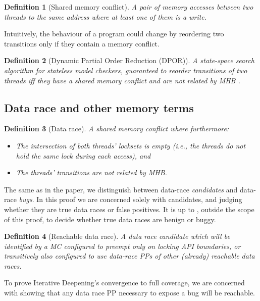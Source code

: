 \documentclass[pldi]{sigplanconf-pldi15}
\newtheorem{definition}{Definition}
\begin{document}
\begin{definition}[Shared memory conflict]
A pair of memory accesses between two threads to the same address where at least one of them is a write.
\end{definition}
Intuitively, the behaviour of a program could change by reordering two transitions only if they contain a memory conflict.

\begin{definition}[Dynamic Partial Order Reduction (DPOR)]
	A state-space search algorithm for stateless model checkers,
	guaranteed to reorder transitions of two threads
	iff they have a shared memory conflict and are not related by MHB \cite{dpor}.
	\label{def:dpor}
\end{definition}

\subsection{Data race and other memory terms}

\begin{definition}[Data race]
A shared memory conflict where furthermore:
\begin{itemize}
	\item The intersection of both threads' locksets is empty (i.e., the threads do not hold the same lock during each access), and
	\item The threads' transitions are not related by MHB.
\end{itemize}
\end{definition}

The same as in the paper, we distinguish between data-race {\em candidates} and data-race {\em bugs}.
In this proof we are concerned solely with candidates, and judging whether they are true data races or false positives.
It is up to \quicksand, outside the scope of this proof, to decide whether true data races are benign or buggy.

\begin{definition}[Reachable data race]
A data race candidate which will be identified by a MC configured to preempt only on locking API boundaries,
or transitively also configured to use data-race PPs of other (already) reachable data races.
\end{definition}

To prove Iterative Deepening's convergence to full coverage,
we are concerned with showing that any data race PP necessary to expose a bug will be reachable.
\end{document}
